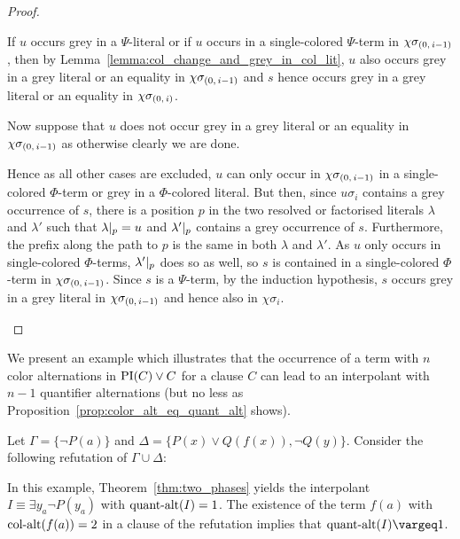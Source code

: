 \documentclass[,%
	draft=false,%
	numbers=noendperiod
	12pt,
	a4paper,
	oneside,%
	openany,
]{memoir}
\newcommand{\inv}{\ensuremath{\chi}}
\begin{document}
\begin{proof}
\begin{itemize}
			If $u$ occurs grey in a $\Psi$-literal or
			if $u$ occurs in a single-colored $\Psi$-term in $\inv\sigmazmi$, then by Lemma~\ref{lemma:col_change_and_grey_in_col_lit}, $u$ also occurs grey in a grey literal or an equality in $\inv\sigmazmi$ and $s$ hence occurs grey in a grey literal or an equality in $\inv\sigmazi$. 

			Now suppose that $u$ does not occur grey in a grey literal or an equality in $\inv\sigmazmi$ as otherwise clearly we are done.

			Hence as all other cases are excluded, $u$ can only occur in $\inv\sigmazmi$ in a single-colored $\Phi$-term or grey in a $\Phi$-colored literal.
			But then, 
			since $u\sigma_i$ contains a grey occurrence of $s$, there is a position $p$ in the two resolved or factorised literals $\lambda$ and $\lambda'$ such that $\lambda\at{p} = u$ and $\lambda'\at{p}$ contains a grey occurrence of $s$.
			Furthermore, the prefix along the path to $p$ is the same in both $\lambda$ and $\lambda'$.
			As $u$ only occurs in single-colored $\Phi$-terms, $\lambda'\at{p}$ does so as well, so $s$ is contained in a single-colored $\Phi$-term in $\inv\sigmazmi$.
			Since $s$ is a $\Psi$-term, by the induction hypothesis, $s$ occurs grey in a grey literal in $\inv\sigmazmi$ and hence also in $\inv\sigma_i$.
			\qedhere
	\end{itemize}

\end{proof}

We present an example which illustrates that the occurrence of a term with $n$ color alternations in $\PI(C) \lor C$ for a clause $C$ can lead to an interpolant with $n-1$ quantifier alternations (but no less as Proposition~\ref{prop:color_alt_eq_quant_alt} shows).
\begin{exa}
	Let $\Gamma = \{ \lnot P(a) \}$ and $\Delta = \{ P(x) \lor Q(f(x)), \lnot Q(y) \}$.
	Consider the following refutation of $\Gamma \cup \Delta$:
	\begin{prooftree}


	\end{prooftree}

	In this example, Theorem~\ref{thm:two_phases} yields the interpolant $I \equiv \exists y_a \lnot P(y_a)$ with $\qa(I) =\nolinebreak 1$.
	The existence of the term $f(a)$ with $\ca(f(a)) = 2$ in a clause of the refutation implies that $\qa(I) \vargeq 1$.
\end{exa}
	
\end{document}

